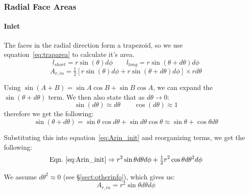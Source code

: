 \documentclass[12pt, letterpaper, twoside]{article}
\begin{document}
        \subsubsection{Radial Face Areas}
        \paragraph{Inlet}

            The faces in the radial direction form a trapezoid, so we use equation~\ref{eq:traparea} to calculate it's area.
            \begin{equation*}
                l_{short} = r\sin(\theta) d\phi  \qquad
                l_{long} = r\sin(\theta + d\theta) d\phi
            \end{equation*}
            \begin{equation}
                A_{r,in} = \tfrac{1}{2} [r\sin(\theta) d\phi + r\sin(\theta + d\theta) d\phi] \times rd\theta
                \label{eq:Arin_init}
            \end{equation}

            Using \(\sin(A+B) = \sin A \cos B + \sin B \cos A \), we can expand the \(\sin (\theta + d\theta)\) term. We then also state that as \(d\theta \rightarrow 0\):
            \begin{equation*}
                \sin (d\theta) \approx d\theta \qquad \cos(d\theta) \approx 1
            \end{equation*}
            therefore we get the following:
            \begin{equation*}
                \sin(\theta+d\theta) = 
                \sin\theta \cos d\theta + \sin d\theta \cos\theta \approx
                \sin\theta + \cos\theta d\theta
            \end{equation*}

            Substituting this into equation~\ref{eq:Arin_init} and reorganizing terms, we get the following:
            \begin{equation*}
                \text{Eqn.}\ \ref{eq:Arin_init} \Rightarrow
                r^2\sin\theta d\theta d\phi + \tfrac{1}{2}r^2\cos \theta d\theta^2 d\phi
            \end{equation*}

            We assume \(d\theta^2 \approx 0\) (see \S \ref{sect:otherinfo}), which gives us:
            \begin{equation}
                A_{r,in} = r^2 \sin\theta d\theta d\phi
                \label{eq:Arin_final}
            \end{equation}
\end{document}
